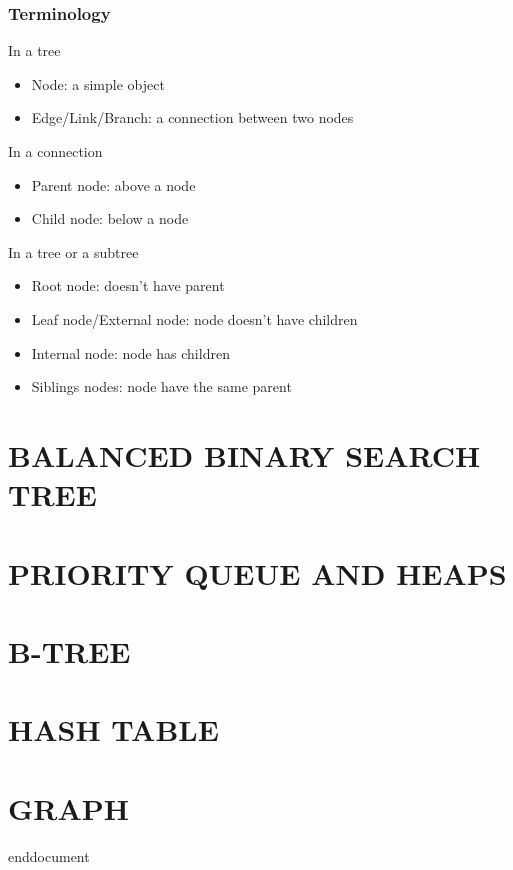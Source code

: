 \documentclass{article}
\begin{document}
\subsubsection{Terminology}
In a tree
\begin{itemize}
    \item Node: a simple object
    \item Edge/Link/Branch: a connection between two nodes
\end{itemize}

In a connection
\begin{itemize}
    \item Parent node: above a node
    \item Child node: below a node
\end{itemize}

In a tree or a subtree
\begin{itemize}
    \item Root node: doesn't have parent
    \item Leaf node/External node: node doesn't have children
    \item Internal node: node has children
    \item Siblings nodes: node have the same parent
\end{itemize}

\section{BALANCED BINARY SEARCH TREE}
\section{PRIORITY QUEUE AND HEAPS}
\section{B-TREE}
\section{HASH TABLE}
\section{GRAPH}
end{document}
\end{document}
